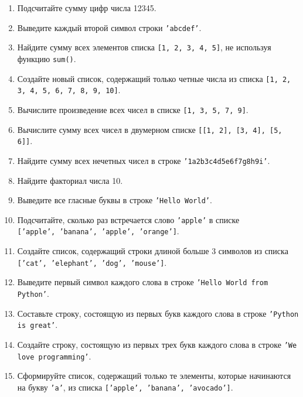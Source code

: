 \documentclass[a4,12pt]{article}
\theoremstyle{remark}
\begin{document}
\begin{enumerate}
    \begin{exercisehint}
    Число называется \emph{палиндромом}, если оно читается одинаково слева направо и справа налево. Например: $12321$, $9009$.
    \end{exercisehint}

    \item Подсчитайте сумму цифр числа 12345.
    \item Выведите каждый второй символ строки \texttt{'abcdef'}.
    \item Найдите сумму всех элементов списка \texttt{[1, 2, 3, 4, 5]}, не используя функцию \texttt{sum()}.
    \item Создайте новый список, содержащий только четные числа из списка \texttt{[1, 2, 3, 4, 5, 6, 7, 8, 9, 10]}.
    \item Вычислите произведение всех чисел в списке \texttt{[1, 3, 5, 7, 9]}.
    \item Вычислите сумму всех чисел в двумерном списке \texttt{[[1, 2], [3, 4], [5, 6]]}.
    \item Найдите сумму всех нечетных чисел в строке \texttt{'1a2b3c4d5e6f7g8h9i'}.
    \item Найдите факториал числа 10.
    \item Выведите все гласные буквы в строке \texttt{'Hello World'}.
    \item Подсчитайте, сколько раз встречается слово \texttt{'apple'} в списке \texttt{['apple',~'banana',~'apple',~'orange']}.
    \item Создайте список, содержащий строки длиной больше 3 символов из списка \texttt{['cat',~'elephant',~'dog',~'mouse']}.
    \item Выведите первый символ каждого слова в строке \texttt{'Hello World from Python'}.
    \item Составьте строку, состоящую из первых букв каждого слова в строке \texttt{'Python is great'}.

    \item Создайте строку, состоящую из первых трех букв каждого слова в строке \texttt{'We love programming'}.

    \item Сформируйте список, содержащий только те элементы, которые начинаются на букву \texttt{'a'}, из списка \texttt{['apple',~'banana',~'avocado']}.


\end{enumerate}
\end{document}
